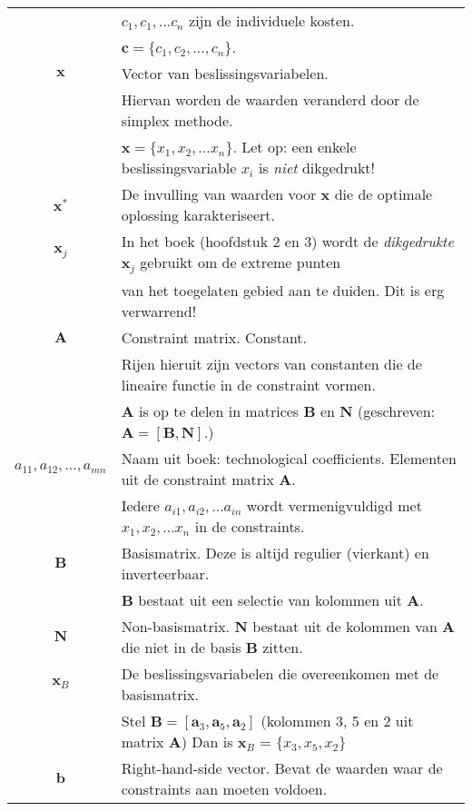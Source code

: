 \documentclass[10pt,a4paper]{article}
\begin{document}
\begin{tabular}{|c|l|}
 & $c_1, c_1, ... c_n$ zijn de individuele kosten. \\ & $\textbf{c} = \{c_1, c_2, ..., c_n\}$. \\ 
\hline 
$\textbf{x}$ & Vector van beslissingsvariabelen. \\ & Hiervan worden de waarden veranderd door de simplex methode. \\ & $\textbf{x} = \{x_1, x_2, ... x_n\}$. Let op: een enkele beslissingsvariable $x_i$ is \textit{niet} dikgedrukt! \\
\hline
$\textbf{x}^*$ & De invulling van waarden voor $\textbf{x}$ die de optimale oplossing karakteriseert. \\ %
\hline
$\textbf{x}_j$ & In het boek (hoofdstuk 2 en 3) wordt de \textit{dikgedrukte} $\textbf{x}_j$ gebruikt om de extreme punten \\ 
 & van het toegelaten gebied aan te duiden. Dit is erg verwarrend! \\
\hline
$\textbf{A}$ & Constraint matrix. Constant. \\ 
 & Rijen hieruit zijn vectors van constanten die de lineaire functie in de constraint vormen. \\
 & $\textbf{A}$ is op te delen in matrices $\textbf{B}$ en $\textbf{N}$ (geschreven: $\textbf{A} = [\textbf{B}, \textbf{N}]$.) \\ %
\hline
$a_{11}, a_{12}, ..., a_{mn}$ & Naam uit boek: technological coefficients. Elementen uit de constraint matrix $\textbf{A}$.\\
& Iedere $a_{i1}, a_{i2}, ... a_{in}$ wordt vermenigvuldigd met $x_1, x_2, ... x_n$ in de constraints. \\
\hline
$\textbf{B}$ & Basismatrix. Deze is altijd regulier (vierkant) en inverteerbaar. \\ %
& $\textbf{B}$ bestaat uit een selectie van kolommen uit $\textbf{A}$.  \\
\hline
$\textbf{N}$ & Non-basismatrix. $\textbf{N}$ bestaat uit de kolommen van $\textbf{A}$ die niet in de basis $\textbf{B}$ zitten. \\
\hline
$\textbf{x}_B$ & De beslissingsvariabelen die overeenkomen met de basismatrix. \\
& Stel $\textbf{B} = [\textbf{a}_3, \textbf{a}_5, \textbf{a}_2]$ (kolommen 3, 5 en 2 uit matrix $\textbf{A}$) 
 Dan is $\textbf{x}_B$ = $\{x_3, x_5, x_2\}$\\
\hline
$\textbf{b}$ & Right-hand-side vector. Bevat de waarden waar de constraints aan moeten voldoen.\\

\end{tabular}
\end{document}
